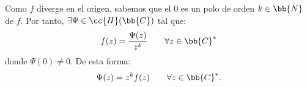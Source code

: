 \documentclass[12pt]{article}
\begin{document}
\begin{ejercicio}[2.5 puntos]
\begin{comment}
        Veamos ahora que el número de ceros de $f$ es finito y mayor o igual que 2 (contando multiplicidad). Supongamos que $f$ tiene un número infinito de ceros (que sabemos que será numerable). Consideramos la siguiente sucesión de ceros:
        \begin{equation*}
            \left\{z_n\right\}_{n\in\bb{N}}\subset Z(f)
        \end{equation*}

        Como $f$ diverge en $+\infty$, sabemos que $\{z_n\}_{n\in\bb{N}}$ está acotada, por lo que admite una parcial $\{z_{n_k}\}_{k\in\bb{N}}$ que converge a un punto $z_0\in \bb{C}$:
        \begin{equation*}
            \{z_{n_k}\}_{k\in\bb{N}}\to z_0\in \bb{C}.
        \end{equation*}

        Supongamos que $z_0=0$. Consideramos la sucesión de imágenes de los ceros:
        \begin{equation*}
            \left\{f(z_{n_k})\right\}_{k\in\bb{N}} = \left\{f(0)\right\}_{k\in\bb{N}} = \left\{0\right\}_{k\in\bb{N}}\to 0
        \end{equation*}

        No obstante, esto contradice el hecho de que $f$ diverge en el origen. Por tanto, $z_0\neq 0$. Como hemos encontrado un punto de acumulación de $Z(f)$ en $\bb{C}^*$, tenemos que $f$ es idénticamente nula, lo que contradice el hecho de que $f$ diverge en el origen. Por tanto, $f$ tiene un número finito de ceros.\\
        \begin{comment}
        Sea $Z(f) = \{z_1, z_2, \ldots, z_m\}$, donde $m\in \bb{N}$ es el número de ceros de $f$. Entonces, podemos escribir:
        \begin{equation*}
            f(z) = g(z)\prod_{j=1}^m (z - z_j)^{m_j}
        \end{equation*}
        donde $m_j\in \bb{N}$ es el orden del cero $z_j$ y $g\in \cc{H}(\bb{C}^*)$ es una función tal que $g(z)\neq 0$ para todo $z\in \bb{C}^*$.
        \end{comment}
        
        
        
        Como $f$ diverge en el origen, sabemos que el $0$ es un polo de orden $k\in \bb{N}$ de $f$. Por tanto, $\exists \Psi\in \cc{H}(\bb{C})$ tal que:
        \begin{equation*}
            f(z) = \dfrac{\Psi(z)}{z^k}\qquad \forall z\in \bb{C}^*
        \end{equation*}
        donde $\Psi(0)\neq 0$. De esta forma:
        \begin{equation*}
            \Psi(z) = z^k f(z)\qquad \forall z\in \bb{C}^*.
        \end{equation*}


\end{ejercicio}
\end{document}
